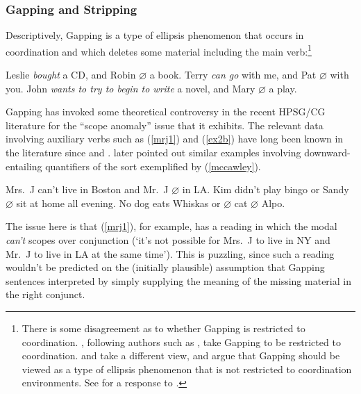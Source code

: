 \documentclass[output=paper
                ,modfonts
 	        ,biblatex
                ,babelshorthands
                ,newtxmath
                ,draftmode
                ,colorlinks, citecolor=brown
]{langscibook}
\begin{document}
\subsubsection{Gapping and Stripping}
\label{sec:gapping}

Descriptively, Gapping is a type of ellipsis phenomenon that occurs in
coordination and which deletes some material including the main
verb:\footnote{There is some disagreement as to whether Gapping is
restricted to coordination. \citet{kubota-levine-gapping}, following
authors such as \citet{johnson2009}, take Gapping to be restricted to
coordination. \citet{parkea18gapping} and \citet{parkDiss} take a
different view, and argue that Gapping should be viewed as a type of
ellipsis phenomenon that is not restricted to coordination
environments. See \citet[46--47]{KubotaLevineBook} for a response to
\citet{parkea18gapping}.}

\begin{exe}
 \ex\label{gapping}
  \begin{xlist}
 \ex\label{ex-leslie-bought-a-cd}
    Leslie \emph{bought} a CD, and Robin   \ensuremath{\varnothing}  a book.
 \ex
    Terry \emph{can go} with me, and Pat  \ensuremath{\varnothing}  with you.
 \ex
    John \emph{wants to try to begin to write} a novel, and Mary  \ensuremath{\varnothing}  a play.
  \end{xlist}
\end{exe}
Gapping has invoked some theoretical controversy in the recent
HPSG/CG literature for the ``scope anomaly'' issue that it exhibits.
The relevant data involving auxiliary verbs such as (\ref{mrj1}) and (\ref{ex2b})
have long been known in the literature since
\citet{oehrle71,oehrle1987} and 
\citet{siegel87}. \citet[247]{mccawley1993} later pointed out similar examples
involving downward-entailing quantifiers of the sort exemplified by (\ref{mccawley}).

\begin{exe}
 \ex\label{scope}
  \begin{xlist}
 \ex\label{mrj1}
    Mrs.\ J can't live in Boston and Mr.\ J  \ensuremath{\varnothing}  in LA.
 \ex\label{ex2b}
    Kim didn't play bingo or Sandy  \ensuremath{\varnothing}  sit at home all evening.
 \ex\label{mccawley}
    No dog eats Whiskas or  \ensuremath{\varnothing}  cat  \ensuremath{\varnothing}  Alpo.
  \end{xlist}
\end{exe}
The issue here is that (\ref{mrj1}), for example, has a reading in
which the modal \textit{can't} scopes over  conjunction (`it's not
possible for Mrs.~J to live in NY and Mr.~J to live in LA at the same
time'). This is puzzling, since such a reading wouldn't be predicted
on the (initially plausible) assumption that Gapping sentences  interpreted by simply supplying the meaning of the missing material
in the right conjunct.
\end{document}
